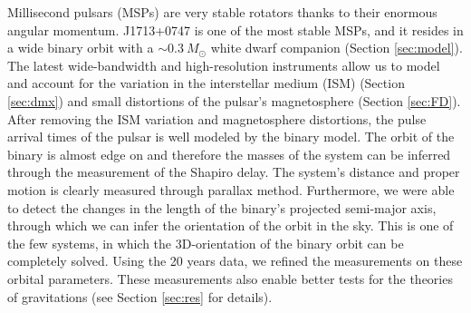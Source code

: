 Millisecond pulsars (MSPs) are very stable rotators thanks to their enormous angular momentum. J1713+0747 is one of the most stable MSPs, and it resides in a wide binary orbit with a $\sim0.3~M_{\odot}$ white dwarf companion (Section \ref{sec:model}). 
The latest wide-bandwidth and high-resolution instruments allow us to model and account for the variation in the interstellar medium (ISM)
(Section \ref{sec:dmx}) and small distortions of the pulsar's magnetosphere (Section \ref{sec:FD}). 
After removing the ISM variation and magnetosphere distortions, the pulse arrival times of the pulsar is well modeled by the binary model.
The orbit of the binary is almost edge on and therefore the masses of the system can be inferred through the measurement of the Shapiro delay. 
The system's distance and proper motion is clearly measured through parallax method.
Furthermore, we were able to detect the changes in the length of the binary's projected semi-major axis, through which we can infer the orientation of the orbit in the sky.
This is one of the few systems, in which the 3D-orientation of the binary orbit can be completely solved. Using the 20 years data, we refined the measurements on these orbital parameters.
These measurements also enable better tests for the theories of gravitations (see Section \ref{sec:res} for details).


